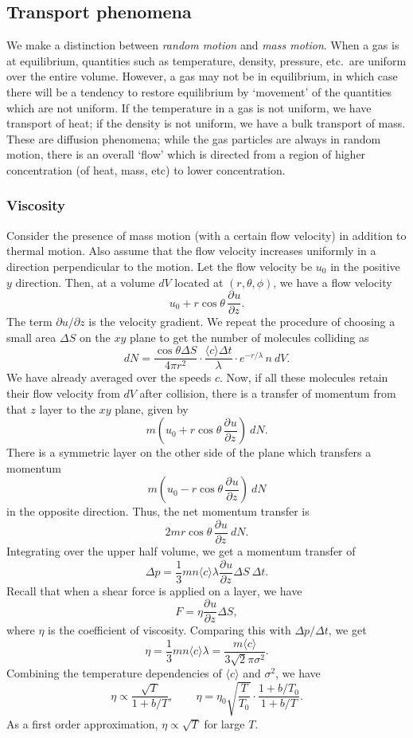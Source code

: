\documentclass[11pt]{article}
\newcommand\pp[3][]{\frac{\partial^{#1}{#2}}{\partial {#3}^{#1}}}
\newcommand\E[1]{\langle #1 \rangle}
\theoremstyle{definition}
\theoremstyle{remark}
\numberwithin{equation}{section}
\begin{document}
    \subsection{Transport phenomena}
    We make a distinction between \textit{random motion} and \textit{mass motion}.
    When a gas is at equilibrium, quantities such as temperature, density, pressure,
    etc.\ are uniform over the entire volume. However, a gas may not be in
    equilibrium, in which case there will be a tendency to restore equilibrium by
    `movement' of the quantities which are not uniform. If the temperature in a gas
    is not uniform, we have transport of heat; if the density is not uniform, we
    have a bulk transport of mass. These are diffusion phenomena; while the gas
    particles are always in random motion, there is an overall `flow' which is
    directed from a region of higher concentration (of heat, mass, etc) to lower
    concentration.

    \subsubsection{Viscosity}
    Consider the presence of mass motion (with a certain flow velocity) in addition
    to thermal motion. Also assume that the flow velocity increases uniformly in a
    direction perpendicular to the motion. Let the flow velocity be $u_0$ in the
    positive $y$ direction. Then, at a volume $dV$ located at $(r, \theta, \phi)$,
    we have a flow velocity \[
        u_0 + r\cos\theta\,\pp{u}{z}.
    \] The term $\partial u / \partial z$ is the velocity gradient.
    We repeat the procedure of choosing a small area $\Delta S$ on the $xy$ plane to
    get the number of molecules colliding as \[
        dN = \frac{\cos\theta \Delta S}{4\pi r^2}\cdot \frac{\E{c}\Delta
        t}{\lambda}\cdot e^{-r / \lambda}\,n\:dV.
    \] We have already averaged over the speeds $c$. Now, if all these molecules
    retain their flow velocity from $dV$ after collision, there is a transfer of
    momentum from that $z$ layer to the $xy$ plane, given by \[
        m\left(u_0 + r\cos\theta\,\pp{u}{z}\right)\:dN.
    \] There is a symmetric layer on the other side of the plane which transfers a
    momentum \[
        m\left(u_0 - r\cos\theta\,\pp{u}{z}\right)\:dN
    \] in the opposite direction. Thus, the net momentum transfer is \[
        2mr\cos\theta\,\pp{u}{z}\:dN.
    \] Integrating over the upper half volume, we get a momentum transfer of \[
        \Delta p = \frac{1}{3}mn\E{c}\lambda \pp{u}{z}\Delta S\:\Delta t.
    \] Recall that when a shear force is applied on a layer, we have \[
        F = \eta \pp{u}{z}\Delta S,
    \] where $\eta$ is the coefficient of viscosity. Comparing this with $\Delta p /
    \Delta t$, we get \[
        \eta = \frac{1}{3}mn\E{c}\lambda = \frac{m\E{c}}{3\sqrt{2}\pi\sigma^2}.
    \] Combining the temperature dependencies of $\E{c}$ and $\sigma^2$, we have \[
        \eta \propto \frac{\sqrt{T}}{1 + b/ T}, \qquad \eta =
        \eta_0\sqrt{\frac{T}{T_0}} \cdot\frac{1 + b / T_0}{1 + b / T}.
    \] As a first order approximation, $\eta \propto \sqrt{T}$ for large $T$.
\end{document}
